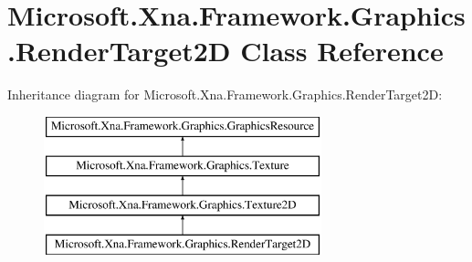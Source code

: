 \hypertarget{class_microsoft_1_1_xna_1_1_framework_1_1_graphics_1_1_render_target2_d}{}\section{Microsoft.\+Xna.\+Framework.\+Graphics.\+Render\+Target2\+D Class Reference}
\label{class_microsoft_1_1_xna_1_1_framework_1_1_graphics_1_1_render_target2_d}
Inheritance diagram for Microsoft.\+Xna.\+Framework.\+Graphics.\+Render\+Target2\+D\+:\begin{figure}[H]
\begin{center}
\leavevmode
\includegraphics[height=4.000000cm]{class_microsoft_1_1_xna_1_1_framework_1_1_graphics_1_1_render_target2_d}
\end{center}
\end{figure}
